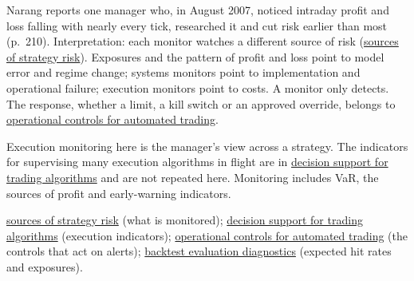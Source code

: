 \begin{qfmethod}
 Narang reports one manager who, in August 2007, noticed intraday profit and loss falling with nearly every tick, researched it and cut risk earlier than most (p.~210). Interpretation: each monitor watches a different source of risk (\hyperref[def:quant-strategy-risk-sources]{sources of strategy risk}). Exposures and the pattern of profit and loss point to model error and regime change; systems monitors point to implementation and operational failure; execution monitors point to costs. A monitor only detects. The response, whether a limit, a kill switch or an approved override, belongs to \hyperref[meth:automated-trading-operational-controls]{operational controls for automated trading}.

 Execution monitoring here is the manager's view across a strategy. The indicators for supervising many execution algorithms in flight are in \hyperref[meth:execution-decision-support]{decision support for trading algorithms} and are not repeated here. Monitoring includes VaR, the sources of profit and early-warning indicators.

 \hyperref[def:quant-strategy-risk-sources]{sources of strategy risk} (what is monitored); \hyperref[meth:execution-decision-support]{decision support for trading algorithms} (execution indicators); \hyperref[meth:automated-trading-operational-controls]{operational controls for automated trading} (the controls that act on alerts); \hyperref[meth:backtest-evaluation-diagnostics]{backtest evaluation diagnostics} (expected hit rates and exposures).

\end{qfmethod}
